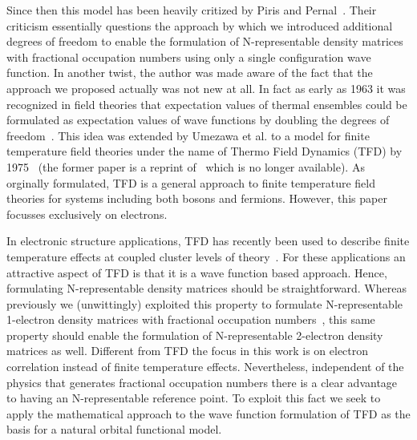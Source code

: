 \documentclass[pra,nofootinbib]{revtex4-1}
\begin{document}
Since then this model has been heavily critized by Piris and 
Pernal~\cite{Piris_2017}. Their criticism essentially questions the approach
by which we introduced additional degrees of freedom to enable the
formulation of N-representable density matrices with fractional occupation
numbers using only a single configuration wave function. In another twist, the
author was made aware of the fact that the approach we proposed actually was 
not new at all. In fact as early as 1963 it was recognized in field theories that 
expectation values of thermal ensembles could be formulated as expectation values
of wave functions by doubling the degrees of freedom~\cite{Araki_1963}. This idea 
was extended by Umezawa et al. to a model for finite temperature field theories under
the name of Thermo Field Dynamics (TFD) by 1975~\cite{TAKAHASHI_1996,Umezawa:1982} (the 
former paper is a reprint of~\cite{TAKAHASHI_1975} which is no longer available).
As orginally formulated, TFD is a general approach to finite temperature field
theories for systems including both bosons and fermions. However, this paper
focusses exclusively on electrons. 

In electronic structure applications, TFD has recently been used to
describe finite temperature effects at coupled cluster levels of
theory~\cite{Harsha_2019,Shushkov_2019}. For these applications an attractive aspect of TFD
is that it is a wave function based approach. Hence, formulating N-representable density
matrices should be straightforward. Whereas previously we (unwittingly)
exploited this property
to formulate N-representable 1-electron density matrices with fractional occupation
numbers~\cite{van_Dam_2016}, this
same property should enable the formulation of N-representable 2-electron density
matrices as well. Different from TFD the focus in this work is on electron
correlation instead of finite temperature effects. Nevertheless, independent
of the physics that generates fractional occupation numbers there is a clear
advantage to having an N-representable reference point. To exploit this fact we seek
to apply the mathematical approach to the wave function formulation of TFD as the basis
for a natural orbital functional model. 
\end{document}
